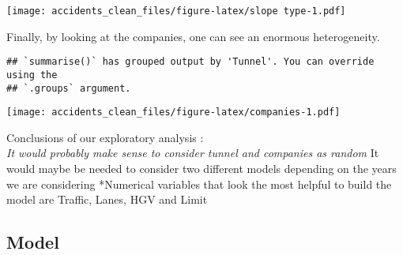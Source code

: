 \documentclass[
]{article}
\begin{document}
\texttt{[image: accidents\_clean\_files/figure-latex/slope type-1.pdf]}

Finally, by looking at the companies, one can see an enormous
heterogeneity.

\begin{verbatim}
## `summarise()` has grouped output by 'Tunnel'. You can override using the
## `.groups` argument.
\end{verbatim}

\texttt{[image: accidents\_clean\_files/figure-latex/companies-1.pdf]}

Conclusions of our exploratory analysis :\\
\emph{It would probably make sense to consider tunnel and companies as
random }It would maybe be needed to consider two different models
depending on the years we are considering *Numerical variables that look
the most helpful to build the model are Traffic, Lanes, HGV and Limit

\hypertarget{model}{%
\subsection{Model}\label{model}}
\end{document}
